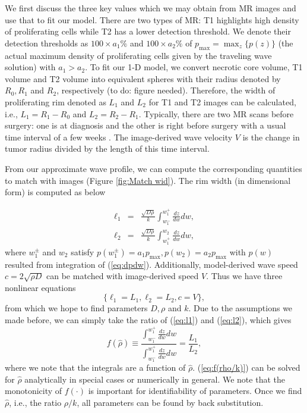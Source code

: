 \documentclass{aims}
\numberwithin{equation}{section}
\begin{document}
We first discuss the three key values which we may obtain
from MR images and use that to fit our model. There are two types of MR: T1
highlights high density of proliferating cells while T2 has a lower
detection threshold. We denote their detection thresholds as $100\times a_{1}\%$
and $100\times a_{2}\%$ of $p_{\max}=\max_{z}\{p(z)\}$ (the actual
maximum density of proliferating cells given by the traveling wave
solution) with $a_{1}>a_{2}$. To fit our 1-D model, we convert necrotic
core volume, T1 volume and T2 volume into equivalent spheres with
their radius denoted by $R_{0},R_{1}$ and $R_{2}$, respectively (to do: figure
needed). Therefore, the width of proliferating rim denoted as $L_{1}$
and $L_{2}$ for T1 and T2 images can be calculated, i.e., $L_{1}=R_{1}-R_{0}$
and $L_{2}=R_{2}-R_{1}$. Typically, there are two MR scans before
surgery: one is at diagnosis and the other is right before surgery
with a usual time interval of a few weeks \cite{Swanson2008}. The
image-derived wave velocity $V$ is the change in tumor radius divided
by the length of this time interval. 

From our approximate wave profile, we can compute the corresponding
quantities to match with images (Figure \ref{fig:Match wid}). The
rim width (in dimensional form) is computed as below

\begin{subequations}
\begin{eqnarray}
\ell_{1} & = & \frac{\sqrt{D\rho}}{k}\int_{w_{1}^{-}}^{w_{1}^{+}}\frac{dz}{dw}dw,\label{eq:l1}\\
\ell_{2} & = & \frac{\sqrt{D\rho}}{k}\int_{w_{1}^{+}}^{w_{2}}\frac{dz}{dw}dw,\label{eq:l2}
\end{eqnarray}
\end{subequations}
where $w_{1}^{\pm}$ and $w_{2}$ satisfy $p(w_{1}^{\pm})=a_{1}p_{\text{max}},p(w_{2})=a_{2}p_{\max}$ with $p(w)$ resulted from integration of (\ref{eq:dpdw}). Additionally, model-derived wave
speed $c=2\sqrt{\rho D}$ can be matched with image-derived speed
$V$. Thus we have three nonlinear equations 
\begin{equation}
\{\ell_{1}=L_{1},\ell_{2}=L_{2},c=V\},\label{eq:l1l2c}
\end{equation}
 from which we hope to find parameters $D,\rho$ and $k$. Due
to the assumptions we made before, we can simply take the ratio of
(\ref{eq:l1}) and (\ref{eq:l2}), which gives 
\begin{equation}
f(\hat{\rho})\equiv\frac{\int_{w_{1}^{-}}^{w_{1}^{+}}\frac{dz}{dw}dw}{\int_{w_{1}^{-}}^{w_{1}^{+}}\frac{dz}{dw}dw}=\frac{L_{1}}{L_{2}},\label{eq:f(rho/k)}
\end{equation}
where we note that the integrals are a function of $\hat{\rho}$. (\ref{eq:f(rho/k)})
can be solved for $\hat{\rho}$ analytically in special cases or numerically
in general. We note that the monotonicity of $f(\cdot)$ is important
for identifiability of parameters. Once we find $\hat{\rho}$, i.e., the ratio $\rho /k$, all parameters can be found by back substitution. 
\end{document}
